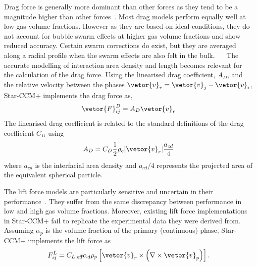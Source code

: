 Drag force is generally more dominant than other forces as they tend to be a magnitude
 higher than other forces~\cite{tas-koehlerCriticalAnalysisDrag2021a}. Most drag models perform 
 equally well at low gas volume fractions. However as they are based on ideal conditions, 
 they do not account for bubble swarm effects at higher gas volume fractions and show reduced 
 accuracy. Certain swarm corrections do exist, but they are averaged along a radial profile when
 the swarm effects are also felt in the bulk.~\cite{sugrueRobustMomentumClosure, sugrueAssessmentSimplifiedSet2017,colomboBenchmarkingCFDModelling}
 ~
 The accurate modelling of interaction area density and length becomes relevant for the calculation
 of the drag force. 
 Using the linearised drag coefficient, $A_{D}$, and the relative velocity between the phases
 $\vetor{v}_{r} = \vetor{v}_{j} - \vetor{v}_{i}$, Star-CCM+ implements the drag force as,
 \begin{equation}
    \vetor{F}_{ij}^{D} = A_{D}\vetor{v}_{r}
 \end{equation}
 The linearised drag coefficient is related to the standard definitions of the drag 
 coefficient $C_{D}$ using
 \begin{equation}
    A_{D} = C_{D} \frac{1}{2} \rho_{c} |\vetor{v}_{r}| \frac{a_{cd}}{4}
 \end{equation}
 where $a_{cd}$ is the interfacial area density and $a_{cd}/4$ represents the projected area of
 the equivalent spherical particle. 

The lift force models are particularly sensitive and uncertain in their performance~\cite{sugrueAssessmentSimplifiedSet2017}.
 They suffer from the same discrepancy between performance in low and 
 high gas volume fractions. Moreover, existing 
 lift force implementations in Star-CCM+ fail to replicate the experimental data
 they were derived from.~\cite{sugrueRobustMomentumClosure}
 Assuming $\alpha_{p}$ is the volume fraction of the primary (continuous)
 phase, Star-CCM+ implements the lift force as
 \begin{equation}
    F_{ij}^{L} = C_{L,\text{eff}} \alpha_{d} \rho_{p} 
    \left[\vetor{v}_{r} \times \left(\nabla \times \vetor{v}_{p}\right)\right].
 \end{equation} 

